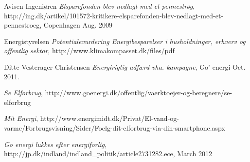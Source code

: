\documentclass[journal]{IEEEtran}
\begin{document}
\begin{thebibliography}{1}
Avisen Ingeniøren \emph{Elsparefonden blev nedlagt med et pennestrøg}, \relax 
http://ing.dk/artikel/101572-kritikere-elsparefonden-blev-nedlagt-med-et-pennestroeg, Copenhagen Aug. 2009

Energistyrelsen \emph{Potentialevurdering Energibesparelser i husholdninger, erhverv og offentlig sektor}, \relax http://www.klimakompasset.dk/files/pdf


Ditte Vesterager Christensen \emph{Energirigtig adfærd vha. kampagne}, \relax Go' energi Oct. 2011.

\emph{Se Elforbrug}, \relax http://www.goenergi.dk/offentlig/vaerktoejer-og-beregnere/se-elforbrug

\emph{Mit Energi}, \relax 
http://www.energimidt.dk/Privat/El-vand-og-varme/Forbrugsvisning/Sider/Foelg-dit-elforbrug-via-din-smartphone.aspx 

\emph{Go energi lukkes efter energiforlig}, \relax
http://jp.dk/indland/indland\_politik/article2731282.ece, March 2012

\end{thebibliography}




\end{document}
